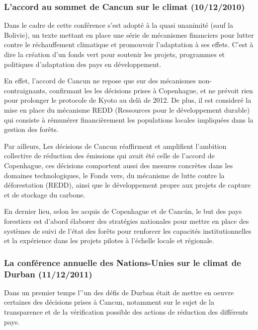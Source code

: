 \documentclass[a4paper,11pt]{article}
\begin{document}
\subsubsection[L’accord au sommet de Cancun sur le climat]{L’accord au sommet de Cancun sur le climat (10/12/2010)}

Dans le  cadre de cette  conférence s’est adopté  à la quasi unanimité  (sauf la
Bolivie),  un texte mettant  en place  une série  de mécanismes  financiers pour
lutter  contre le  réchauffement  climatique et  promouvoir  l'adaptation à  ses
effets. C’est  à dire  la création  d’un fonds vert  pour soutenir  les projets,
programmes et politiques d'adaptation des pays en développement. 


En effet, l'accord de Cancun ne repose que sur des mécanismes non-contraignants,
confirmant  les les  décisions  prises à  Copenhague,  et ne  prévoit rien  pour
prolonger le protocole  de Kyoto au delà  de 2012. De plus, il  est consideré la
mise en place  du mécanisme REDD (Ressources pour  le développement durable) qui
consiste à  rémunérer financièrement les populations locales  impliquées dans la
gestion des forêts. 


Par  ailleurs, Les  décisions  de Cancun  réaffirment  et amplifient  l’ambition
collective  de  réduction des  émissions  qui avait  été  celle  de l’accord  de
Copenhague,  ces  décisions comportent  aussi  des  mesures  concrètes dans  les
domaines  technologiques,  le  Fonds  vers,  du mécanisme  de  lutte  contre  la
déforestation (REDD), ainsi  que le développement propre aux  projets de capture
et de stockage du carbone.


En dernier lieu,  selon les acquis de  Copenhague et de Cancún, le  but des pays
forestiers est d’abord  élaborer des stratégies nationales pour  mettre en place
des  systèmes  de  suivi de  l’état  des  forêts  pour renforcer  les  capacités
institutionnelles et la  expérience dans les projets pilotes  à l’échelle locale
et régionale.


\subsubsection[La  conférence  annuelle  des  Nations-Unies  sur  le  climat  de
Durban]{La  conférence  annuelle  des  Nations-Unies  sur le  climat  de  Durban
  (11/12/2011)} 

Dans  un premier  temps l’'un  des défis  de Durban  était de  mettre  en oeuvre
certaines  des  décisions  prises  à  Cancun,  notamment  sur  le  sujet  de  la
transparence  et  de la  vérification  possible  des  actions de  réduction  des
différents pays. 
\end{document}
